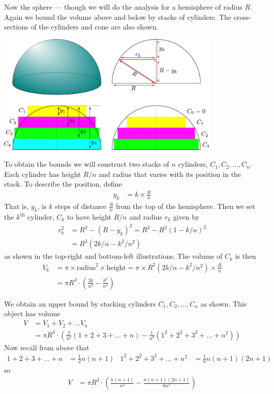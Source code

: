 Now the sphere --- though we will do the analysis for a hemisphere of radius $R$. Again
we bound the volume above and below by stacks of cylinders. The cross-sections of the
cylinders and cone are also shown.
\begin{center}
 \includegraphics[width=0.8\textwidth]{sphere}
\end{center}
To obtain the bounds we will construct two stacks of $n$ cylinders, $C_1,C_2,\dots,C_n$.
Each cylinder has height $R/n$ and radius that varies with its position in the
stack. To describe the position, define
\begin{align*}
  y_k &= k \times \frac{R}{n}
\end{align*}
That is, $y_k$, is $k$ steps of distance $\frac{R}{n}$ from the top of the
hemisphere. Then we set the $k^\mathrm{th}$ cylinder, $C_k$ to have height $R/n$
and radius $r_k$ given by
\begin{align*}
  r_k^2 &= R^2 - (R-y_k)^2 = R^2 - R^2(1-k/n)^2 \\
  &= R^2( 2k/n - k^2/n^2)
\end{align*}
as shown in the top-right and bottom-left illustrations. The volume of $C_k$ is then
\begin{align*}
  V_k &= \pi \times \text{radius}^2 \times \text{height}
  = \pi \times R^2 \left(2k/n - k^2/n^2  \right) \times \frac{R}{n}\\
  &=  \pi R^3 \cdot \left( \frac{2k}{n^2}  - \frac{k^2}{n^3} \right)
\end{align*}

We obtain an upper bound by stacking cylinders $C_1,C_2,\dots,C_n$ as shown. This object
has volume
\begin{align*}
  V &= V_1 + V_2 + \dots V_n \\
  &=
\pi R^3 \cdot \left( \frac{2}{n^2}\left(1 + 2 + 3 + \dots + n \right)
- \frac{1}{n^3}\left(1^2 + 2^2 + 3^2 + \dots + n^2 \right) \right)
\end{align*}
Now recall from above that
\begin{align*}
  1 + 2 + 3 + \dots +n &= \frac{1}{2} n(n+1) &
  1^2 + 2^2 + 3^2 + \dots +n^2 &= \frac{1}{6} n(n+1)(2n+1)
\end{align*}
so
\begin{align*}
  V &= \pi R^3 \cdot \left( \frac{n(n+1)}{n^2}
- \frac{n(n+1)(2n+1)}{6n^3} \right)
\end{align*}


